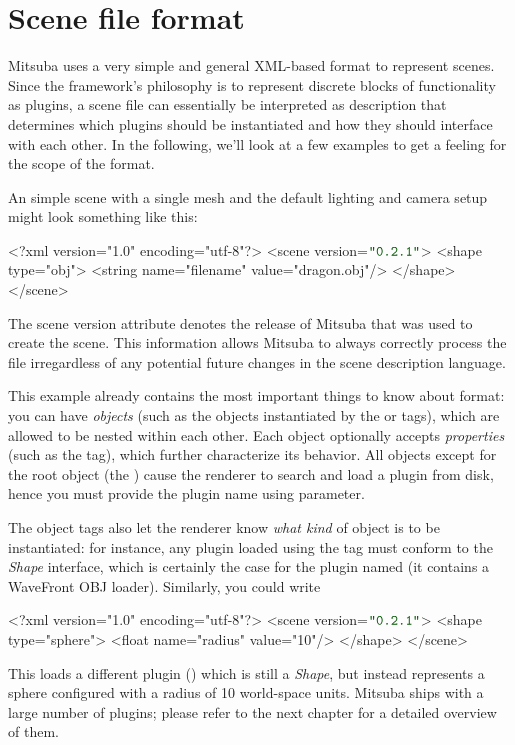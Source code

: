 \section{Scene file format}
Mitsuba uses a very simple and general XML-based format to represent scenes.  
Since the framework's philosophy is to represent discrete blocks of functionality as plugins, 
a scene file can essentially be interpreted as description that determines which 
plugins should be instantiated and how they should interface with each other.
In the following, we'll look at a few examples to get a feeling for the scope of the
format.

An simple scene with a single mesh and the default lighting and camera setup might look
something like this:
\begin{xml}
<?xml version="1.0" encoding="utf-8"?>
<scene version=$\MtsVer$>
	<shape type="obj">
		<string name="filename" value="dragon.obj"/>
	</shape>
</scene>
\end{xml}
The scene version attribute denotes the release of Mitsuba that was used to
create the scene. This information allows Mitsuba to always correctly process the 
file irregardless of any potential future changes in the scene description language.

This example already contains the most important things to know about format: you can have
\emph{objects} (such as the objects instantiated by the  or  tags), 
which are allowed to be nested within each other. Each object optionally accepts \emph{properties} 
(such as the  tag), which further characterize its behavior. All objects except 
for the root object (the ) cause the renderer to search and load a plugin from disk,
hence you must provide the plugin name using  parameter. 

The object tags also let the renderer know \emph{what kind} of object is to be instantiated: for instance, 
any plugin loaded using the  tag must conform to the \emph{Shape} interface, which is
certainly the case for the plugin named  (it contains a WaveFront OBJ loader).
Similarly, you could write
\begin{xml}
<?xml version="1.0" encoding="utf-8"?>
<scene version=$\MtsVer$>
	<shape type="sphere">
		<float name="radius" value="10"/>
	</shape>
</scene>
\end{xml}
This loads a different plugin () which is still a \emph{Shape}, but instead represents 
a sphere configured with a radius of 10 world-space units. Mitsuba ships with 
a large number of plugins; please refer to the next chapter for a detailed
overview of them.

